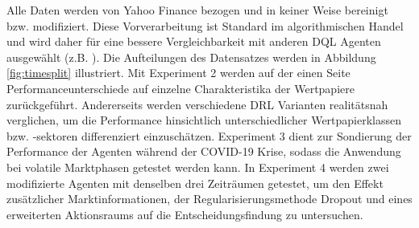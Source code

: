 Alle Daten werden von Yahoo Finance bezogen und in keiner Weise bereinigt bzw. modifiziert.
Diese Vorverarbeitung ist Standard im algorithmischen Handel und wird daher für eine bessere Vergleichbarkeit mit anderen \acs{DQL} Agenten ausgewählt (z.B. \parencite{théate2020application,zhang2019deep}).
Die Aufteilungen des Datensatzes werden in Abbildung \ref{fig:timesplit} illustriert.
Mit Experiment 2 werden auf der einen Seite Performanceunterschiede auf einzelne Charakteristika der Wertpapiere zurückgeführt.
Andererseits werden verschiedene \acs{DRL} Varianten realitätsnah verglichen, um die Performance hinsichtlich unterschiedlicher Wertpapierklassen bzw. -sektoren differenziert einzuschätzen.
Experiment 3 dient zur Sondierung der Performance der Agenten während der COVID-19 Krise, sodass die Anwendung bei volatile Marktphasen getestet werden kann.
In Experiment 4 werden zwei modifizierte Agenten mit denselben drei Zeiträumen getestet, um den Effekt zusätzlicher Marktinformationen, der Regularisierungsmethode Dropout und eines erweiterten Aktionsraums auf die Entscheidungsfindung zu untersuchen.

